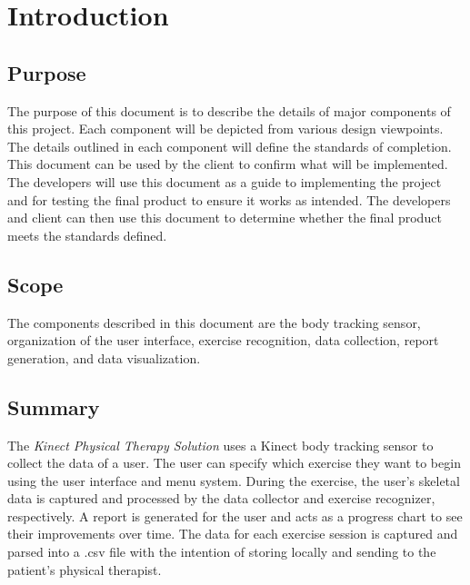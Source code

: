 \documentclass[onecolumn, draftclsnofoot,10pt, compsoc]{IEEEtran}
\begin{document}
\section{Introduction}
\subsection{Purpose}
The purpose of this document is to describe the details of major components of this project. Each component will be depicted from various design viewpoints. The details outlined in each component will define the standards of completion. This document can be used by the client to confirm what will be implemented. The developers will use this document as a guide to implementing the project and for testing the final product to ensure it works as intended. The developers and client can then use this document to determine whether the final product meets the standards defined.

\subsection{Scope}
The components described in this document are the body tracking sensor, organization of the user interface, exercise recognition, data collection, report generation, and data visualization. 

\subsection{Summary}
The \textit{Kinect Physical Therapy Solution} uses a Kinect body tracking sensor to collect the data of a user. The user can specify which exercise they want to begin using the user interface and menu system. During the exercise, the user's skeletal data is captured and processed by the data collector and exercise recognizer, respectively. A report is generated for the user and acts as a progress chart to see their improvements over time. The data for each exercise session is captured and parsed into a .csv file with the intention of storing locally and sending to the patient's physical therapist. 
\end{document}

